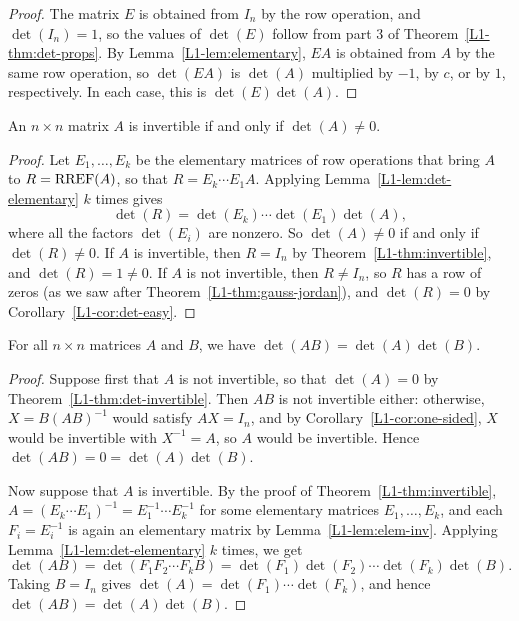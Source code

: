 \begin{proof}
    The matrix $E$ is obtained from $I_n$ by the row operation, and $\det(I_n) = 1$, so the values of $\det(E)$ follow from part 3 of Theorem~\ref{L1-thm:det-props}. By Lemma~\ref{L1-lem:elementary}, $EA$ is obtained from $A$ by the same row operation, so $\det(EA)$ is $\det(A)$ multiplied by $-1$, by $c$, or by $1$, respectively. In each case, this is $\det(E) \det(A)$.
\end{proof}

\begin{theorem}\label{L1-thm:det-invertible}
    An $n \times n$ matrix $A$ is invertible if and only if $\det(A) \neq 0$.
\end{theorem}

\begin{proof}
    Let $E_1, \ldots, E_k$ be the elementary matrices of row operations that bring $A$ to $R = \operatorname{RREF}(A)$, so that $R = E_k \cdots E_1 A$. Applying Lemma~\ref{L1-lem:det-elementary} $k$ times gives
    \[\det(R) = \det(E_k) \cdots \det(E_1) \det(A),\]
    where all the factors $\det(E_i)$ are nonzero. So $\det(A) \neq 0$ if and only if $\det(R) \neq 0$. If $A$ is invertible, then $R = I_n$ by Theorem~\ref{L1-thm:invertible}, and $\det(R) = 1 \neq 0$. If $A$ is not invertible, then $R \neq I_n$, so $R$ has a row of zeros (as we saw after Theorem~\ref{L1-thm:gauss-jordan}), and $\det(R) = 0$ by Corollary~\ref{L1-cor:det-easy}.
\end{proof}

\begin{theorem}\label{L1-thm:det-product}
    For all $n \times n$ matrices $A$ and $B$, we have $\det(AB) = \det(A) \det(B)$.
\end{theorem}

\begin{proof}
    Suppose first that $A$ is not invertible, so that $\det(A) = 0$ by Theorem~\ref{L1-thm:det-invertible}. Then $AB$ is not invertible either: otherwise, $X = B(AB)^{-1}$ would satisfy $AX = I_n$, and by Corollary~\ref{L1-cor:one-sided}, $X$ would be invertible with $X^{-1} = A$, so $A$ would be invertible. Hence $\det(AB) = 0 = \det(A) \det(B)$.

    Now suppose that $A$ is invertible. By the proof of Theorem~\ref{L1-thm:invertible}, $A = (E_k \cdots E_1)^{-1} = E_1^{-1} \cdots E_k^{-1}$ for some elementary matrices $E_1, \ldots, E_k$, and each $F_i = E_i^{-1}$ is again an elementary matrix by Lemma~\ref{L1-lem:elem-inv}. Applying Lemma~\ref{L1-lem:det-elementary} $k$ times, we get
    \[\det(AB) = \det(F_1 F_2 \cdots F_k B) = \det(F_1) \det(F_2) \cdots \det(F_k) \det(B).\]
    Taking $B = I_n$ gives $\det(A) = \det(F_1) \cdots \det(F_k)$, and hence $\det(AB) = \det(A) \det(B)$.
\end{proof}

